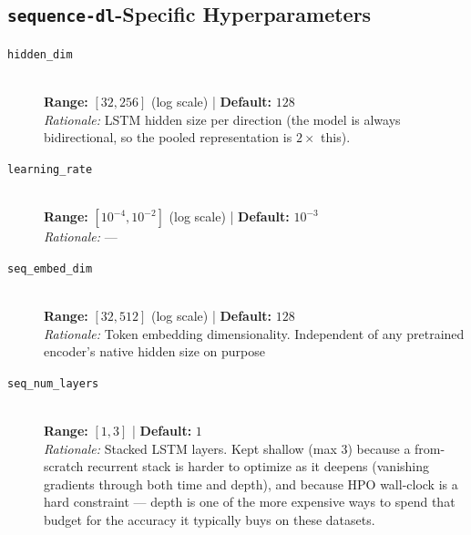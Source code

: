 \documentclass[10pt]{article}
\begin{document}
\subsection*{\texttt{sequence-dl}-Specific Hyperparameters}

\begin{description}
    \item[\texttt{hidden\_dim}] \hfill \\
    \textbf{Range:} $[32, 256]$ (log scale) \quad | \quad \textbf{Default:} $128$ \\
    \textit{Rationale:} LSTM hidden size per direction (the model is always bidirectional, so the pooled representation is $2\times$ this).

    \item[\texttt{learning\_rate}] \hfill \\
    \textbf{Range:} $[10^{-4}, 10^{-2}]$ (log scale) \quad | \quad \textbf{Default:} $10^{-3}$ \\
    \textit{Rationale:} ---



    \item[\texttt{seq\_embed\_dim}] \hfill \\
    \textbf{Range:} $[32, 512]$ (log scale) \quad | \quad \textbf{Default:} $128$ \\
    \textit{Rationale:} Token embedding dimensionality. Independent of any pretrained encoder's native hidden size on purpose{}

    \item[\texttt{seq\_num\_layers}] \hfill \\
    \textbf{Range:} $[1, 3]$ \quad | \quad \textbf{Default:} $1$ \\
    \textit{Rationale:} Stacked LSTM layers. Kept shallow (max 3) because a from-scratch recurrent stack is harder to optimize as it deepens (vanishing gradients through both time and depth), and because HPO wall-clock is a hard constraint --- depth is one of the more expensive ways to spend that budget for the accuracy it typically buys on these datasets.


\end{description}
\end{document}
